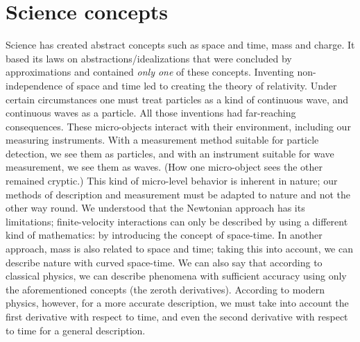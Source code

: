 
\section{Science concepts\label{sec:Physics_ScienceConcepts}\label{sec:Physics-Abstraction}}




Science has created abstract concepts such as space and time, mass and charge.
It based its laws on abstractions/idealizations that were concluded by approximations and contained \textit{only one} of these concepts. 
Inventing non-independence of space and time led to creating the theory of relativity.
Under certain circumstances one must treat particles as a kind of continuous wave, and continuous waves as a particle.
All those inventions had far-reaching consequences.
These micro-objects interact with their environment, including our measuring instruments.
With a measurement method suitable for particle detection, we see them as particles, and with an instrument suitable for wave measurement, we see them as waves.
(How one micro-object sees the other remained cryptic.)
This kind of micro-level behavior is inherent in nature; our methods of description and measurement must be adapted to nature and not the other way round.
We understood that the Newtonian approach has its limitations; finite-velocity interactions can only be described by using a different kind of mathematics: by introducing the concept of space-time.
In another approach, mass is also related to space and time; taking this into account, we can describe nature with curved space-time.
We can also say that according to classical physics, we can describe phenomena with sufficient accuracy using only the aforementioned concepts (the zeroth derivatives).
According to modern physics, however, for a more accurate description, we must take into account the first derivative with respect to time, 
and even the second derivative with respect to time for a general description.



